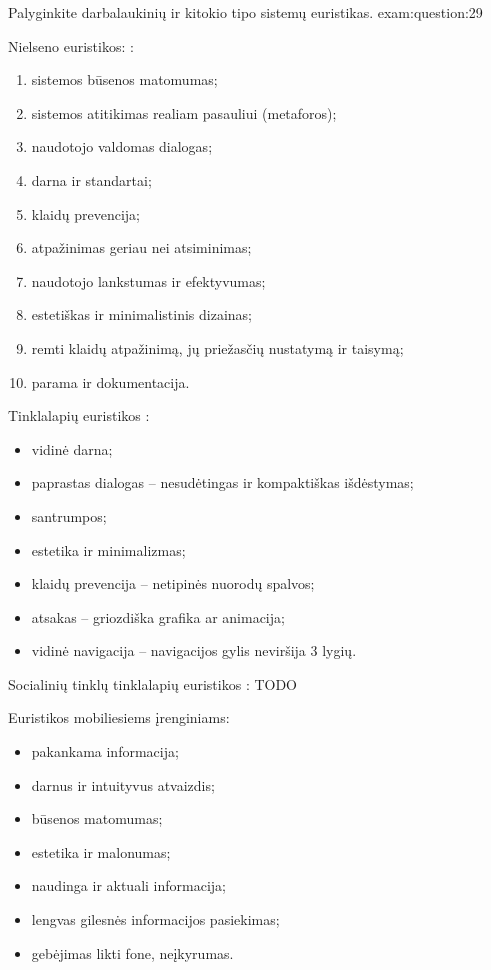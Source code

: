\begin{question}{%
  Palyginkite darbalaukinių ir kitokio tipo sistemų euristikas.
  }{exam:question:29}

  Nielseno euristikos: \cite[6]{skaidres-11}:
  \begin{enumerate}
    \item sistemos būsenos matomumas;
    \item sistemos atitikimas realiam pasauliui (metaforos);
    \item naudotojo valdomas dialogas;
    \item darna ir standartai;
    \item klaidų prevencija;
    \item atpažinimas geriau nei atsiminimas;
    \item naudotojo lankstumas ir efektyvumas;
    \item estetiškas ir minimalistinis dizainas;
    \item remti klaidų atpažinimą, jų priežasčių nustatymą ir taisymą;
    \item parama ir dokumentacija.
  \end{enumerate}
  
  Tinklalapių euristikos \cite[50]{skaidres-12}:
  \begin{itemize}
    \item vidinė darna;
    \item paprastas dialogas – nesudėtingas ir kompaktiškas išdėstymas;
    \item santrumpos;
    \item estetika ir minimalizmas;
    \item klaidų prevencija – netipinės nuorodų spalvos;
    \item atsakas – griozdiška grafika ar animacija;
    \item vidinė navigacija – navigacijos gylis neviršija 3 lygių.
  \end{itemize}

  Socialinių tinklų tinklalapių euristikos \cite[51]{skaidres-12}:
  TODO

  Euristikos mobiliesiems įrenginiams:
  \begin{itemize}
    \item pakankama informacija;
    \item darnus ir intuityvus atvaizdis;
    \item būsenos matomumas;
    \item estetika ir malonumas;
    \item naudinga ir aktuali informacija;
    \item lengvas gilesnės informacijos pasiekimas;
    \item gebėjimas likti fone, neįkyrumas.
  \end{itemize}


\end{question}
